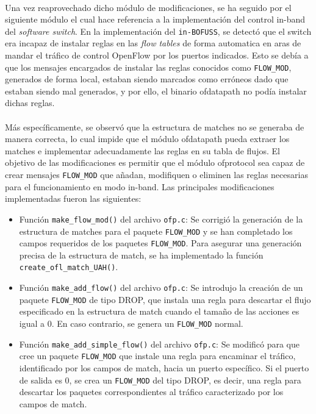 \\
Una vez reaprovechado dicho módulo de modificaciones, se ha seguido por el siguiente módulo el cual hace referencia a la implementación del control in-band del \textit{software switch}. En la implementación del \texttt{in-BOFUSS}, se detectó que el switch era incapaz de instalar reglas en las \textit{flow tables} de forma automatica en aras de mandar el tráfico de control OpenFlow por los puertos indicados. Esto se debía a que los mensajes encargados de instalar las reglas conocidos como \texttt{FLOW\_MOD}, generados de forma local, estaban siendo marcados como erróneos dado que estaban siendo mal generados, y por ello, el binario ofdatapath no podía instalar dichas reglas.\\
\\
Más específicamente, se observó que la estructura de matches no se generaba de manera correcta, lo cual impide que el módulo ofdatapath pueda extraer los matches e implementar adecuadamente las reglas en su tabla de flujos. El objetivo de las modificaciones es permitir que el módulo ofprotocol sea capaz de crear mensajes \texttt{FLOW\_MOD} que añadan, modifiquen o eliminen las reglas necesarias para el funcionamiento en modo in-band. Las principales modificaciones implementadas fueron las siguientes:

\begin{itemize}
    \item Función \texttt{make\_flow\_mod()} del archivo \texttt{ofp.c}: Se corrigió la generación de la estructura de matches para el paquete \texttt{FLOW\_MOD} y se han completado los campos requeridos de los paquetes \texttt{FLOW\_MOD}. Para asegurar una generación precisa de la estructura de match, se ha implementado la función \texttt{create\_ofl\_match\_UAH()}.

    \item Función \texttt{make\_add\_flow()} del archivo \texttt{ofp.c}: Se introdujo la creación de un paquete \texttt{FLOW\_MOD} de tipo DROP, que instala una regla para descartar el flujo especificado en la estructura de match cuando el tamaño de las acciones es igual a 0. En caso contrario, se genera un \texttt{FLOW\_MOD} normal.

    \item Función \texttt{make\_add\_simple\_flow()} del archivo \texttt{ofp.c}: Se modificó para que cree un paquete \texttt{FLOW\_MOD} que instale una regla para encaminar el tráfico, identificado por los campos de match, hacia un puerto específico. Si el puerto de salida es 0, se crea un \texttt{FLOW\_MOD} del tipo DROP, es decir, una regla para descartar los paquetes correspondientes al tráfico caracterizado por los campos de match.
\end{itemize}

